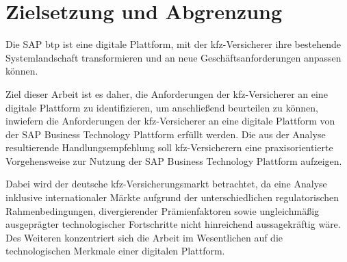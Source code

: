 
\section{Zielsetzung und Abgrenzung}

Die SAP \ac{btp} ist eine digitale Plattform, mit der \ac{kfz}-Versicherer ihre bestehende Systemlandschaft transformieren und an neue Geschäftsanforderungen anpassen können.

Ziel dieser Arbeit ist es daher, die Anforderungen der \ac{kfz}-Versicherer an eine digitale Plattform zu identifizieren, um anschließend beurteilen zu können, inwiefern die Anforderungen der \ac{kfz}-Versicherer an eine digitale Plattform von der SAP Business Technology Plattform erfüllt werden. Die aus der Analyse resultierende Handlungsempfehlung soll \ac{kfz}-Versicherern eine praxisorientierte Vorgehensweise zur Nutzung der SAP Business Technology Plattform aufzeigen.

Dabei wird der deutsche \ac{kfz}-Versicherungsmarkt betrachtet, da eine Analyse inklusive internationaler Märkte aufgrund der unterschiedlichen regulatorischen Rahmenbedingungen, divergierender Prämienfaktoren sowie ungleichmäßig ausgeprägter technologischer Fortschritte nicht hinreichend aussagekräftig wäre. Des Weiteren konzentriert sich die Arbeit im Wesentlichen auf die technologischen Merkmale einer digitalen Plattform. 


